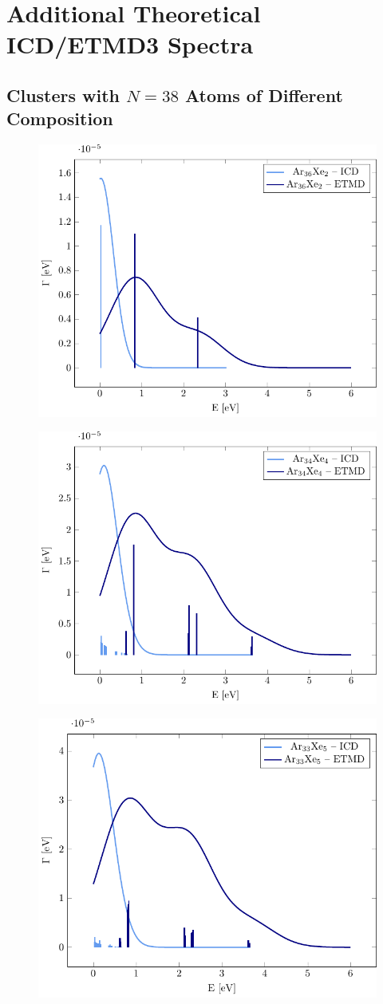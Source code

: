\section{Additional Theoretical ICD/ETMD3 Spectra}

\subsection{Clusters with $N=38$ Atoms of Different Composition}

\begin{figure}
 \centering
 \includegraphics[width=0.5\columnwidth]{pics/Ar36Xe2.pdf}
 \caption{}
 \label{}
\end{figure}


\begin{figure}
 \centering
 \includegraphics[width=0.5\columnwidth]{pics/Ar34Xe4.pdf}
 \caption{}
 \label{}
\end{figure}


\begin{figure}
 \centering
 \includegraphics[width=0.5\columnwidth]{pics/Ar33Xe5.pdf}
 \caption{}
 \label{}
\end{figure}

